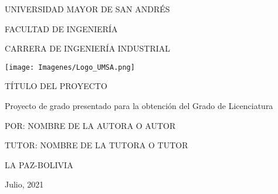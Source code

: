 \begin{titlepage}
	\begin{center}
		{\LARGE UNIVERSIDAD MAYOR DE SAN ANDRÉS}
		
		{\Large FACULTAD DE INGENIERÍA}
		
		{\Large CARRERA DE INGENIERÍA INDUSTRIAL}
		\vspace{1cm}%
		
		\texttt{[image: Imagenes/Logo\_UMSA.png]} 
		
	    \vspace{1cm} 
		{\Large TÍTULO DEL PROYECTO}
	    \vspace{1cm} 
	    
		{\small Proyecto de grado presentado para la obtención del Grado de Licenciatura}
	
		{\Large POR: NOMBRE DE LA AUTORA O AUTOR}
		
		\vspace{1cm} 
		{\large TUTOR: NOMBRE DE LA TUTORA O TUTOR}
        \vspace{1cm} 

		\vfill
		LA PAZ-BOLIVIA
		
	    Julio, 2021
	\end{center}
\end{titlepage}
